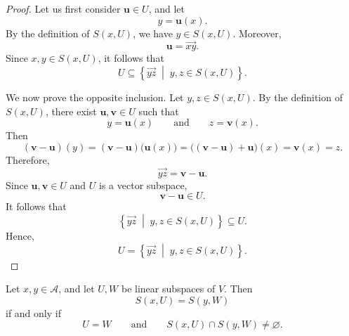 \documentclass[12pt]{article}
\begin{document}
\begin{proof}
Let us first consider \(\mathbf{u}\in U\), and let
\[
y=\mathbf{u}(x).
\]
By the definition of \(S(x,U)\), we have \(y\in S(x,U)\). Moreover,
\[
\mathbf{u}=\overrightarrow{xy}.
\]
Since \(x,y\in S(x,U)\), it follows that
\[
U
\subseteq
\left\{
\overrightarrow{yz}
\;\middle|\;
y,z\in S(x,U)
\right\}.
\]

We now prove the opposite inclusion. Let \(y,z\in S(x,U)\). By the
definition of \(S(x,U)\), there exist \(\mathbf{u},\mathbf{v}\in U\)
such that
\[
y=\mathbf{u}(x)
\qquad\text{and}\qquad
z=\mathbf{v}(x).
\]
Then
\[
(\mathbf{v}-\mathbf{u})(y)
=
(\mathbf{v}-\mathbf{u})\bigl(\mathbf{u}(x)\bigr)
=
\bigl((\mathbf{v}-\mathbf{u})+\mathbf{u}\bigr)(x)
=
\mathbf{v}(x)
=
z.
\]
Therefore,
\[
\overrightarrow{yz}
=
\mathbf{v}-\mathbf{u}.
\]
Since \(\mathbf{u},\mathbf{v}\in U\) and \(U\) is a vector subspace,
\[
\mathbf{v}-\mathbf{u}\in U.
\]
It follows that
\[
\left\{
\overrightarrow{yz}
\;\middle|\;
y,z\in S(x,U)
\right\}
\subseteq U.
\]
Hence,
\[
U
=
\left\{
\overrightarrow{yz}
\;\middle|\;
y,z\in S(x,U)
\right\}.
\]
\end{proof}

\begin{proposition}
Let \(x,y\in \mathcal A\), and let \(U,W\) be linear subspaces of \(V\). Then
\[
S(x,U)=S(y,W)
\]
if and only if
\[
U=W
\qquad\text{and}\qquad
S(x,U)\cap S(y,W)\neq\varnothing.
\]
\end{proposition}
\end{document}
